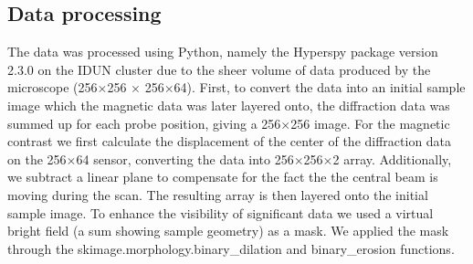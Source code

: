 \subsection{Data processing}
The data was processed using Python, namely the Hyperspy package version 2.3.0 \cite{de_la_pena_2016_hyperspy} on the IDUN cluster \cite{sjalander+:2019epic} due to the sheer volume of data produced by the microscope (256$\times$256 $\times$ 256$\times$64). First, to convert the data into an initial sample image which the magnetic data was later layered onto, the diffraction data was summed up for each probe position, giving a 256$\times$256 image. For the magnetic contrast we first calculate the displacement of the center of the diffraction data on the 256$\times$64 sensor, converting the data into 256$\times$256$\times$2 array. Additionally, we subtract a linear plane to compensate for the fact the the central beam is moving during the scan. The resulting array is then layered onto the initial sample image. To enhance the visibility of significant data we used a virtual bright field (a sum showing sample geometry) as a mask. We applied the mask through the skimage.morphology.binary\_dilation and binary\_erosion functions.

